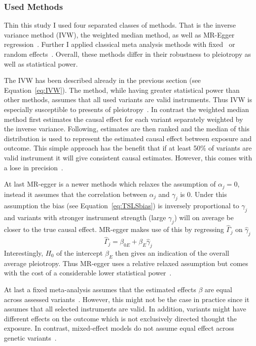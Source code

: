 \subsubsection{Used Methods}
\label{ssub:Used_Metheds}

Thin this study I used four separated classes of methods.
That is the inverse variance method (IVW), the weighted median method, as well as MR-Egger regression~\cite{Bowden2015}.
Further I applied classical meta analysis methods with fixed~\cite{Nelson2015a} or random effects~\cite{Ahmad2015a}.
Overall, these methods differ in their robustness to pleiotropy as well as statistical power.

The IVW has been described already in the previous section (see Equation~\ref{eq:IVW}).
The method, while having greater statistical power than other methods, assumes that all used variants are valid instruments.
Thus IVW is especially susceptible to presents of pleiotropy~\cite{Burgess2015b}.
In contrast the weighted median method first estimates the causal effect for each variant separately weighted by the inverse variance. 
Following, estimates are then ranked and the median of this distribution is used to represent the estimated causal effect between exposure and outcome.
This simple approach has the benefit that if at least 50\% of variants are valid instrument it will give consistent causal estimates.
However, this comes with a lose in precision~\cite{Bowden2015}.

At last MR-egger is a newer methods which relaxes the assumption of $\alpha_j=0$, instead it assumes that the correlation between $\alpha_j$ and $\gamma_j$ is $0$.
Under this assumption the bias (see Equation~\ref{eq:TSLSbias}) is inversely proportional to $\gamma_j$ and variants with stronger instrument strength (large $\gamma_j$) will on average be closer to the true causal effect.
MR-egger makes use of this by regressing $\hat{\Gamma}_j$ on $\hat{\gamma}_j$
\begin{equation}\label{eq:egger}
  \hat{\Gamma}_j = \beta_{0E} + \beta_{E} \hat{\gamma}_j
\end{equation}
Interestingly, $H_0$ of the intercept $\beta_E$ then gives an indication of the overall average pleiotropy.
Thus MR-egger uses a relative relaxed assumption but comes with the cost of a considerable lower statistical power~\cite{Bowden2015}.

At last a fixed meta-analysis assumes that the estimated effects $\beta$ are equal across assessed variants~\cite{Burgess2015b}.
However, this might not be the case in practice since it assumes that all selected instruments are valid.
In addition, variants might have different effects on the outcome which is not exclusively directed thought the exposure. 
In contrast, mixed-effect models do not assume equal effect across genetic variants~\cite{Burgess2015b}.

